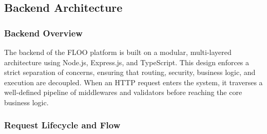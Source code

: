 \subsection{Backend Architecture}
\subsubsection{Backend Overview}
The backend of the FLOO platform is built on a modular, multi-layered architecture using Node.js, Express.js, and TypeScript. This design enforces a strict separation of concerns, ensuring that routing, security, business logic, and execution are decoupled. When an HTTP request enters the system, it traverses a well-defined pipeline of middlewares and validators before reaching the core business logic.

\subsubsection{Request Lifecycle and Flow}

